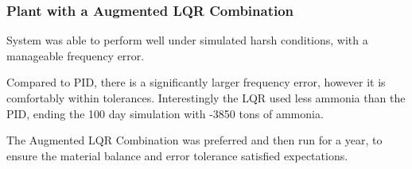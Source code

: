 






\subsubsection{Plant with a Augmented LQR Combination}

System was able to perform well under simulated harsh conditions, with a manageable frequency error.

Compared to PID, there is a significantly larger frequency error, however it is comfortably within tolerances.
Interestingly the LQR used less ammonia than the PID, ending the 100 day simulation with -3850 tons of ammonia.

The Augmented LQR Combination was preferred and then run for a year, to ensure the material balance and error tolerance satisfied expectations.



